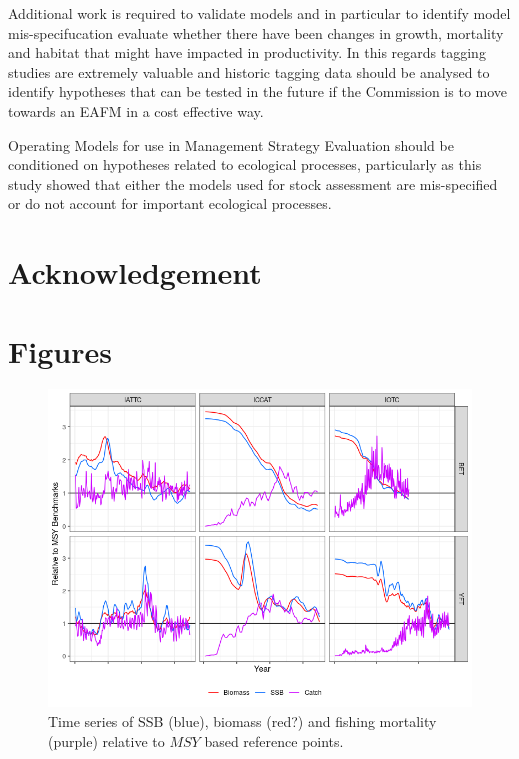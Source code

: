 \documentclass[12pt,doublespacing,a4paper]{ouparticle}
\begin{document}
Additional work is required to validate models and in particular to identify model mis-specifucation evaluate whether there have been changes in growth, mortality and  habitat that might have impacted in productivity. In this regards tagging studies are extremely valuable and historic tagging data should be analysed to identify hypotheses that can be tested in the future if the Commission is to move towards an EAFM in a cost effective way. 



Operating Models for use in Management Strategy Evaluation should be conditioned on hypotheses related to ecological processes, particularly as this study showed that either the models used for stock assessment are mis-specified or do not account for important ecological processes.


\section{Acknowledgement}


\clearpage
%
%


\clearpage
\section{Figures}


\newpage
\begin{figure}[h]
\centering
\includegraphics[width=\textwidth]{pe-tsmsy-1.png}
\caption{Time series of SSB (blue), biomass (red?) and fishing mortality (purple) relative to $MSY$ based reference points.}
\label{fig:ts}
\end{figure}
\end{document}
